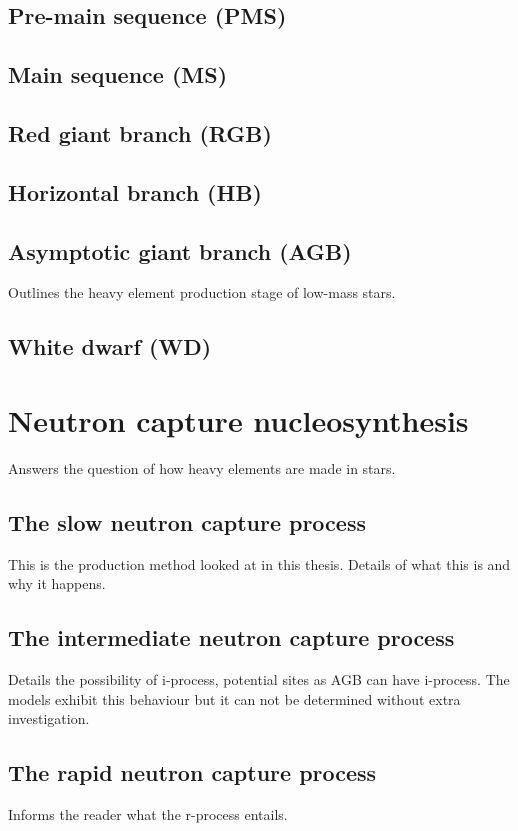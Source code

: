 \subsection{Pre-main sequence (PMS)}

\subsection{Main sequence (MS)}

\subsection{Red giant branch (RGB)}

\subsection{Horizontal branch (HB)}

\subsection{Asymptotic giant branch (AGB)}

Outlines the heavy element production stage of low-mass stars.

\subsection{White dwarf (WD)}

\section{Neutron capture nucleosynthesis}

Answers the question of how heavy elements are made in stars.

\subsection{The slow neutron capture process}

This is the production method looked at in this thesis. Details of what this is and why it happens.

\subsection{The intermediate neutron capture process}

Details the possibility of i-process, potential sites as AGB can have i-process. The models exhibit this behaviour but it can not be determined without extra investigation.

\subsection{The rapid neutron capture process}

Informs the reader what the r-process entails.